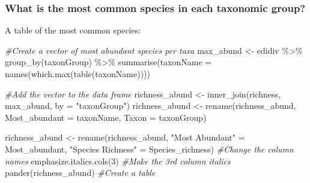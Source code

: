 \documentclass[
  12pt,
]{article}
\newenvironment{Shaded}{\begin{snugshade}}{\end{snugshade}}
\newcommand{\AttributeTok}[1]{\textcolor[rgb]{0.77,0.63,0.00}{#1}}
\newcommand{\CommentTok}[1]{\textcolor[rgb]{0.56,0.35,0.01}{\textit{#1}}}
\newcommand{\DecValTok}[1]{\textcolor[rgb]{0.00,0.00,0.81}{#1}}
\newcommand{\FunctionTok}[1]{\textcolor[rgb]{0.00,0.00,0.00}{#1}}
\newcommand{\NormalTok}[1]{#1}
\newcommand{\OtherTok}[1]{\textcolor[rgb]{0.56,0.35,0.01}{#1}}
\newcommand{\SpecialCharTok}[1]{\textcolor[rgb]{0.00,0.00,0.00}{#1}}
\newcommand{\StringTok}[1]{\textcolor[rgb]{0.31,0.60,0.02}{#1}}
\begin{document}
\hypertarget{what-is-the-most-common-species-in-each-taxonomic-group}{%
\subsubsection{What is the most common species in each taxonomic
group?}\label{what-is-the-most-common-species-in-each-taxonomic-group}}

A table of the most common species:

\begin{Shaded}
\begin{Highlighting}[]
\CommentTok{\#Create a vector of most abundant species per taxa}
\NormalTok{max\_abund }\OtherTok{\textless{}{-}}
\NormalTok{  edidiv }\SpecialCharTok{\%\textgreater{}\%}
    \FunctionTok{group\_by}\NormalTok{(taxonGroup) }\SpecialCharTok{\%\textgreater{}\%}
    \FunctionTok{summarise}\NormalTok{(}\AttributeTok{taxonName =} \FunctionTok{names}\NormalTok{(}\FunctionTok{which.max}\NormalTok{(}\FunctionTok{table}\NormalTok{(taxonName))))}

\CommentTok{\#Add the vector to the data frame}
\NormalTok{richness\_abund }\OtherTok{\textless{}{-}}
\FunctionTok{inner\_join}\NormalTok{(richness, max\_abund, }\AttributeTok{by =} \StringTok{"taxonGroup"}\NormalTok{)}
\NormalTok{richness\_abund }\OtherTok{\textless{}{-}} \FunctionTok{rename}\NormalTok{(richness\_abund, }\AttributeTok{Most\_abundant =}\NormalTok{  taxonName, }\AttributeTok{Taxon =}\NormalTok{ taxonGroup)}
\end{Highlighting}
\end{Shaded}

\begin{Shaded}
\begin{Highlighting}[]
\NormalTok{richness\_abund }\OtherTok{\textless{}{-}} \FunctionTok{rename}\NormalTok{(richness\_abund, }
                        \StringTok{"Most Abundant"} \OtherTok{=}\NormalTok{ Most\_abundant,}
                        \StringTok{"Species Richness"} \OtherTok{=}\NormalTok{ Species\_richness) }\CommentTok{\#Change the column names}
\FunctionTok{emphasize.italics.cols}\NormalTok{(}\DecValTok{3}\NormalTok{) }\CommentTok{\#Make the 3rd column italics}
\FunctionTok{pander}\NormalTok{(richness\_abund) }\CommentTok{\#Create a table}
\end{Highlighting}
\end{Shaded}
\end{document}
